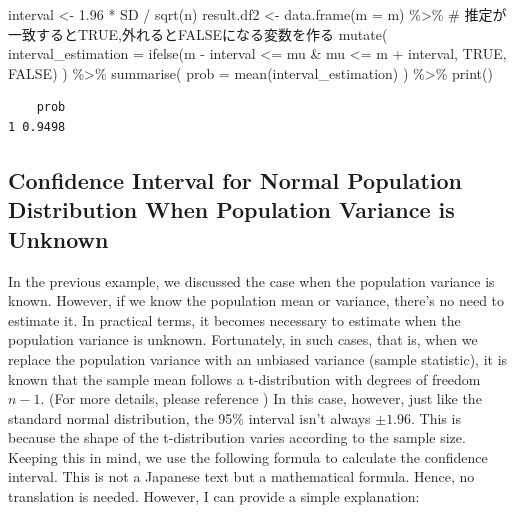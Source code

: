 \documentclass[
  a4paper,
]{book}
\newenvironment{Shaded}{\begin{snugshade}}{\end{snugshade}}
\newcommand{\AttributeTok}[1]{\textcolor[rgb]{0.40,0.45,0.13}{#1}}
\newcommand{\CommentTok}[1]{\textcolor[rgb]{0.37,0.37,0.37}{#1}}
\newcommand{\ConstantTok}[1]{\textcolor[rgb]{0.56,0.35,0.01}{#1}}
\newcommand{\FloatTok}[1]{\textcolor[rgb]{0.68,0.00,0.00}{#1}}
\newcommand{\FunctionTok}[1]{\textcolor[rgb]{0.28,0.35,0.67}{#1}}
\newcommand{\NormalTok}[1]{\textcolor[rgb]{0.00,0.23,0.31}{#1}}
\newcommand{\OtherTok}[1]{\textcolor[rgb]{0.00,0.23,0.31}{#1}}
\newcommand{\SpecialCharTok}[1]{\textcolor[rgb]{0.37,0.37,0.37}{#1}}
\begin{document}
\begin{Shaded}
\begin{Highlighting}[]
\NormalTok{interval }\OtherTok{\textless{}{-}} \FloatTok{1.96} \SpecialCharTok{*}\NormalTok{ SD }\SpecialCharTok{/} \FunctionTok{sqrt}\NormalTok{(n)}
\NormalTok{result.df2 }\OtherTok{\textless{}{-}} \FunctionTok{data.frame}\NormalTok{(}\AttributeTok{m =}\NormalTok{ m) }\SpecialCharTok{\%\textgreater{}\%}
  \CommentTok{\# 推定が一致するとTRUE,外れるとFALSEになる変数を作る}
  \FunctionTok{mutate}\NormalTok{(}
    \AttributeTok{interval\_estimation =} \FunctionTok{ifelse}\NormalTok{(m }\SpecialCharTok{{-}}\NormalTok{ interval }\SpecialCharTok{\textless{}=}\NormalTok{ mu }\SpecialCharTok{\&}\NormalTok{ mu }\SpecialCharTok{\textless{}=}\NormalTok{ m }\SpecialCharTok{+}\NormalTok{ interval, }\ConstantTok{TRUE}\NormalTok{, }\ConstantTok{FALSE}\NormalTok{)}
\NormalTok{  ) }\SpecialCharTok{\%\textgreater{}\%}
  \FunctionTok{summarise}\NormalTok{(}
    \AttributeTok{prob =} \FunctionTok{mean}\NormalTok{(interval\_estimation)}
\NormalTok{  ) }\SpecialCharTok{\%\textgreater{}\%}
  \FunctionTok{print}\NormalTok{()}
\end{Highlighting}
\end{Shaded}

\begin{verbatim}
    prob
1 0.9498
\end{verbatim}

\subsection{Confidence Interval for Normal Population Distribution When
Population Variance is
Unknown}\label{confidence-interval-for-normal-population-distribution-when-population-variance-is-unknown}

In the previous example, we discussed the case when the population
variance is known. However, if we know the population mean or variance,
there's no need to estimate it. In practical terms, it becomes necessary
to estimate when the population variance is unknown. Fortunately, in
such cases, that is, when we replace the population variance with an
unbiased variance (sample statistic), it is known that the sample mean
follows a t-distribution with degrees of freedom \(n-1\). (For more
details, please reference \textcite{kosugi2023}) In this case, however,
just like the standard normal distribution, the 95\% interval isn't
always \(\pm 1.96\). This is because the shape of the t-distribution
varies according to the sample size. Keeping this in mind, we use the
following formula to calculate the confidence interval. This is not a
Japanese text but a mathematical formula. Hence, no translation is
needed. However, I can provide a simple explanation:
\end{document}
